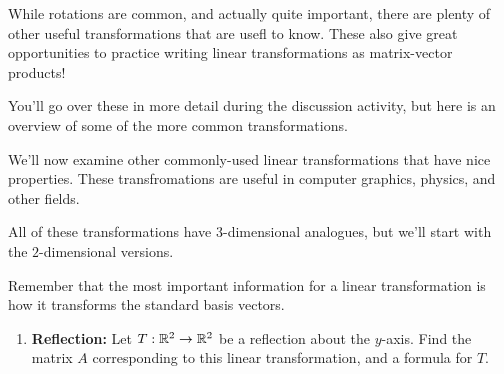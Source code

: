 \documentclass{ximera}
\begin{document}
\begin{exploration}

    While rotations are common, and actually quite important, there are plenty of other useful transformations that are usefl to know. These also give great opportunities to practice writing linear transformations as matrix-vector products!

    You'll go over these in more detail during the discussion activity, but here is an overview of some of the more common transformations.

    \begin{example}

        We'll now examine other commonly-used linear transformations that have nice properties. These transfromations are useful in computer graphics, physics, and other fields. 

        All of these transformations have $3$-dimensional analogues, but we'll start with the $2$-dimensional versions.

        Remember that the most important information for a linear transformation is how it transforms the standard basis vectors.

        \begin{enumerate}

            \item {\bf Reflection:} Let $T:\mathbb{R}^2\to\mathbb{R}^2$ be a reflection about the $y$-axis. Find the
            matrix%
             $A$ corresponding to this
            linear transformation, and a formula for $T$.
          

\end{enumerate}
\end{example}
\end{exploration}
\end{document}
